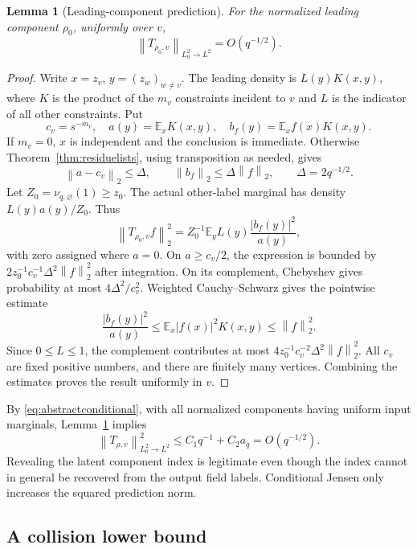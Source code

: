 \documentclass[11pt,a4paper]{article}
\numberwithin{equation}{section}
\newtheorem{lemma}[theorem]{Lemma}
\theoremstyle{definition}
\theoremstyle{remark}
\newcommand{\E}{\mathbb E}
\newcommand{\norm}[1]{\left\lVert #1\right\rVert}
\begin{document}
\begin{lemma}[Leading-component prediction]
\label{lem:leadingconditional}
For the normalized leading component $\rho_0$, uniformly over $v$,
\[
 \norm{T_{\rho_0,v}}_{L^2_0\to L^2}=O(q^{-1/2}).
\]
\end{lemma}
\begin{proof}
Write $x=z_v$, $y=(z_w)_{w\ne v}$. The leading density is
$L(y)K(x,y)$, where $K$ is the product of the $m_v$ constraints incident
to $v$ and $L$ is the indicator of all other constraints. Put
\[
 c_v=s^{-m_v},\quad a(y)=\E_xK(x,y),\quad
 b_f(y)=\E_x f(x)K(x,y).
\]
If $m_v=0$, $x$ is independent and the conclusion is immediate.
Otherwise Theorem~\ref{thm:residuelists}, using transposition as needed,
gives
\begin{equation}
 \norm{a-c_v}_2\le\Delta,\qquad
 \norm{b_f}_2\le\Delta\norm f_2,
 \qquad \Delta=2q^{-1/2}.
 \label{eq:ab}
\end{equation}
Let $Z_0=\nu_{q,\varnothing}(1)\ge z_0$. The actual other-label
marginal has density $L(y)a(y)/Z_0$. Thus
\begin{equation}
 \norm{T_{\rho_0,v}f}_2^2
 =Z_0^{-1}\E_y L(y)\frac{|b_f(y)|^2}{a(y)},
 \label{eq:conditionalratio}
\end{equation}
with zero assigned where $a=0$. On $a\ge c_v/2$, the expression is
bounded by $2z_0^{-1}c_v^{-1}\Delta^2\norm f_2^2$ after integration.
On its complement, Chebyshev gives probability at most
$4\Delta^2/c_v^2$. Weighted Cauchy--Schwarz gives the pointwise estimate
\[
 \frac{|b_f(y)|^2}{a(y)}
 \le\E_x|f(x)|^2K(x,y)\le\norm f_2^2.
\]
Since $0\le L\le1$, the complement contributes at most
$4z_0^{-1}c_v^{-2}\Delta^2\norm f_2^2$.
All $c_v$ are fixed positive numbers, and there are finitely many
vertices. Combining the estimates proves the result uniformly in $v$.
\end{proof}

By \eqref{eq:abstractconditional}, with all normalized components
having uniform input marginals, Lemma~\ref{lem:leadingconditional}
implies
\begin{equation}
 \norm{T_{\rho,v}}_{L^2_0\to L^2}^2
 \le C_1q^{-1}+C_2a_q=O(q^{-1/2}).
 \label{eq:conditionalupper}
\end{equation}
Revealing the latent component index is legitimate even though the
index cannot in general be recovered from the output field labels.
Conditional Jensen only increases the squared prediction norm.

\subsection{A collision lower bound}
\end{document}
